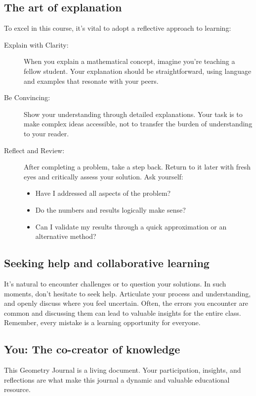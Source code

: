 \documentclass[handout,nooutcomes,noauthor]{ximera}
\begin{document}
\subsection{The art of explanation}

To excel in this course, it's vital to adopt a reflective approach to
learning:
\begin{description}
\item[Explain with Clarity:] When you explain a mathematical concept, imagine you're teaching a fellow student. Your explanation should be straightforward, using language and examples that resonate with your peers.
\item[Be Convincing:] Show your understanding through detailed explanations. Your task is to make complex ideas accessible, not to transfer the burden of understanding to your reader.
\item[Reflect and Review:] After completing a problem, take a step back. Return to it later with fresh eyes and critically assess your solution. Ask yourself:
  \begin{itemize}
        \item Have I addressed all aspects of the problem?
        \item Do the numbers and results logically make sense?
        \item Can I validate my results through a quick approximation
          or an alternative method?
  \end{itemize}
\end{description}

\subsection{Seeking help and collaborative learning}

It's natural to encounter challenges or to question your solutions. In
such moments, don't hesitate to seek help. Articulate your process and
understanding, and openly discuss where you feel uncertain. Often, the
errors you encounter are common and discussing them can lead to
valuable insights for the entire class. Remember, every mistake is a
learning opportunity for everyone.



\subsection{You: The co-creator of knowledge}

This Geometry Journal is a living document. Your participation,
insights, and reflections are what make this journal a dynamic and
valuable educational resource.
\end{document}
